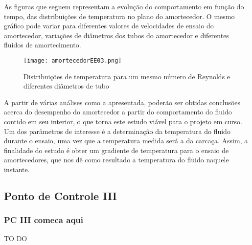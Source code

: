 	As figuras que seguem representam a evolução do comportamento em função do tempo, das distribuições de temperatura no plano do amortecedor. O mesmo gráfico pode variar para diferentes valores de velocidades de ensaio do amortecedor, variações de diâmetros dos tubos do amortecedor e diferentes fluidos de amortecimento.

	\begin{figure}[!h]
		\centering
		\texttt{[image: amortecedorEE03.png]}
		\caption[Distribuições de temperatura para um mesmo número de Reynolds e diferentes diâmetros de tubo]{Distribuições de temperatura para um mesmo número de Reynolds e diferentes diâmetros de tubo \cite{Neto}} 
		\label{amortecedorEE03}
	\end{figure}

	A partir de várias análises como a apresentada, poderão ser obtidas conclusões acerca do desempenho do amortecedor a partir do comportamento do fluido contido em seu interior, o que torna este estudo viável para o projeto em curso. Um dos parâmetros de interesse é a determinação da temperatura do fluido durante o ensaio, uma vez que a temperatura medida será a da carcaça. Assim, a finalidade do estudo é obter um gradiente de temperatura para o ensaio de amortecedores, que nos dê como resultado a temperatura do fluido naquele instante.

\newpage
\subsection{Ponto de Controle III}
\subsubsection{PC III comeca aqui}
	
	TO DO